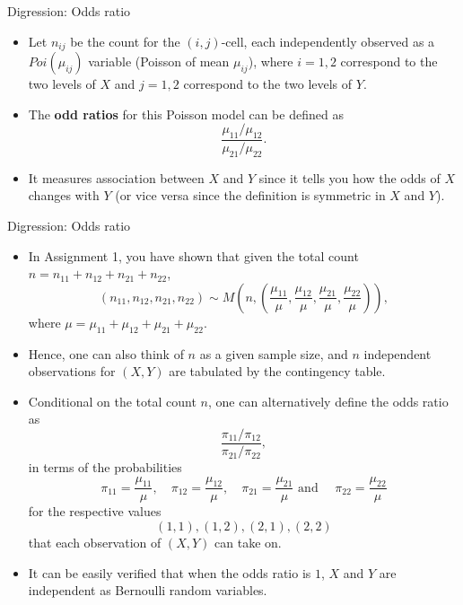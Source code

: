 \documentclass{beamer}
\newenvironment{wideitemize}%
  {\begin{itemize}%
    \setlength{\parskip}{1em}}%
  {\end{itemize}}
\begin{document}
\begin{frame}{Digression: Odds ratio}
\begin{wideitemize}
\item Let $n_{ij}$ be the count for the $(i, j)$-cell, each independently observed as a $Poi(\mu_{ij})$ variable (Poisson of mean $\mu_{ij}$), where $i =1, 2$ correspond to the two levels of $X$ and $j = 1, 2$ correspond to the two levels of $Y$. 

\item The {\bf odd ratios} for this Poisson model can be defined as 
\[
\frac{ \mu_{11} / \mu_{12}}{\mu_{21} / \mu_{22}}.
\]

\item It measures association between $X$ and $Y$ since it tells you how the odds of $X$ changes with $Y$ (or vice versa since the definition is symmetric in $X$ and $Y$). 


\end{wideitemize}



\end{frame}


\begin{frame}{Digression: Odds ratio}
\begin{wideitemize}
\item In Assignment 1, you have shown that given the total count $n = n_{11} + n_{12}  + n_{21} + n_{22}$, 
\[
(n_{11}, n_{12}, n_{21}, n_{22}) \sim M\left(n, \left(\frac{\mu_{11}}{\mu}, \frac{\mu_{12}}{\mu}, \frac{\mu_{21}}{\mu}, \frac{\mu_{22}}{\mu}\right)\right),
\]
where $\mu =\mu_{11}+\mu_{12}+ \mu_{21} + \mu_{22}$.

\item Hence, one can also think of $n$ as a given sample size, and $n$ independent observations for $(X, Y)$ are tabulated by the contingency table.

\end{wideitemize}
\end{frame}


\begin{frame}
\begin{wideitemize}
\item Conditional on  the total count $n$, one can alternatively define the odds ratio  as
\[
\frac{ \pi_{11} / \pi_{12}}{\pi_{21} / \pi_{22}},
\]
in terms of the probabilities 
\[
\pi_{11}  = \frac{\mu_{11}}{\mu}, \quad \pi_{12} = \frac{\mu_{12}}{\mu}, \quad \pi_{21}  =  \frac{\mu_{21}}{\mu} \text{ and } \quad \pi_{22}  =  \frac{\mu_{22}}{\mu}
\]
for the respective values 
\[
(1, 1), (1, 2), (2, 1), (2, 2)
\]
 that each observation of $(X, Y)$ can take on.
 
 \item It can be easily verified that when the odds ratio is $1$, $X$ and $Y$ are independent as Bernoulli random variables. 
\end{wideitemize}
\end{frame}
\end{document}
